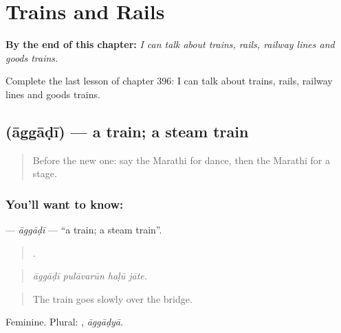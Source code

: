 
\chapter{Trains and Rails}
\label{ch:mr-trains-and-rails}

\begin{chapteropening}
\textbf{By the end of this chapter:} \emph{I can talk about trains, rails, railway lines and goods trains.}

Complete the last lesson of chapter 396: I can talk about trains, rails, railway lines and goods trains.
\end{chapteropening}

\section[\texorpdfstring{\mr{आगगाडी} (āggāḍī)}{आगगाडी (āggāḍī)}]{ (āggāḍī) — a train; a steam train}

\label{lesson:MR-C396-aggadi}



\begin{quote}
Before the new one: say the Marathi for dance, then the Marathi for a stage.
\end{quote}

\subsection*{You'll want to know: }
\textbf{} — \emph{āggāḍī} — \textquotedblleft{}a train; a steam train\textquotedblright{}.

\begin{quote}
   .
\end{quote}

\begin{quote}
\emph{āggāḍī pulāvarūn haḷū jāte.}
\end{quote}

\begin{quote}
The train goes slowly over the bridge.
\end{quote}

Feminine. Plural: , \emph{āggāḍyā}.

